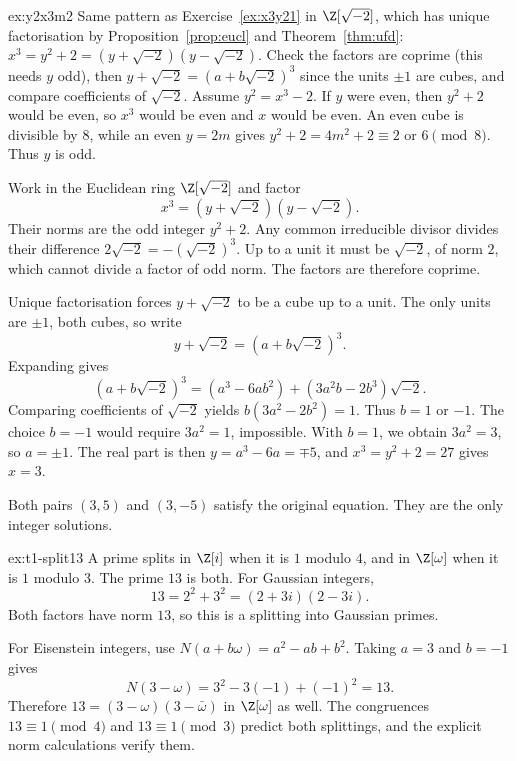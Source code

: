 \begin{solution}{ex:y2x3m2}
\idea Same pattern as Exercise~\ref{ex:x3y21} in $\Z[\sqrt{-2}]$, which has unique factorisation by Proposition~\ref{prop:eucl} and Theorem~\ref{thm:ufd}: $x^3=y^2+2=(y+\sqrt{-2})(y-\sqrt{-2})$. Check the factors are coprime (this needs $y$ odd), then $y+\sqrt{-2}=(a+b\sqrt{-2})^3$ since the units $\pm1$ are cubes, and compare coefficients of $\sqrt{-2}$.
\writeup Assume $y^2=x^3-2$. If $y$ were even, then $y^2+2$ would be even, so $x^3$ would be even and $x$ would be even. An even cube is divisible by $8$, while an even $y=2m$ gives $y^2+2=4m^2+2\equiv2$ or $6\pmod8$. Thus $y$ is odd.

Work in the Euclidean ring $\Z[\sqrt{-2}]$ and factor
\[
x^3=(y+\sqrt{-2})(y-\sqrt{-2}).
\]
Their norms are the odd integer $y^2+2$. Any common irreducible divisor divides their difference $2\sqrt{-2}=-(\sqrt{-2})^3$. Up to a unit it must be $\sqrt{-2}$, of norm $2$, which cannot divide a factor of odd norm. The factors are therefore coprime.

Unique factorisation forces $y+\sqrt{-2}$ to be a cube up to a unit. The only units are $\pm1$, both cubes, so write
\[
y+\sqrt{-2}=(a+b\sqrt{-2})^3.
\]
Expanding gives
\[
(a+b\sqrt{-2})^3
=(a^3-6ab^2)+(3a^2b-2b^3)\sqrt{-2}.
\]
Comparing coefficients of $\sqrt{-2}$ yields
$b(3a^2-2b^2)=1$. Thus $b=1$ or $-1$. The choice $b=-1$ would require $3a^2=1$, impossible. With $b=1$, we obtain $3a^2=3$, so $a=\pm1$. The real part is then $y=a^3-6a=\mp5$, and $x^3=y^2+2=27$ gives $x=3$.

Both pairs $(3,5)$ and $(3,-5)$ satisfy the original equation. They are the only integer solutions.
\end{solution}

\begin{solution}{ex:t1-split13}
\idea A prime splits in $\Z[i]$ when it is $1$ modulo $4$, and in $\Z[\omega]$ when it is $1$ modulo $3$. The prime $13$ is both.
\writeup For Gaussian integers,
\[
13=2^2+3^2=(2+3i)(2-3i).
\]
Both factors have norm $13$, so this is a splitting into Gaussian primes.

For Eisenstein integers, use $N(a+b\omega)=a^2-ab+b^2$. Taking $a=3$ and $b=-1$ gives
\[
N(3-\omega)=3^2-3(-1)+(-1)^2=13.
\]
Therefore $13=(3-\omega)(3-\bar\omega)$ in $\Z[\omega]$ as well. The congruences $13\equiv1\pmod4$ and $13\equiv1\pmod3$ predict both splittings, and the explicit norm calculations verify them.
\end{solution}

